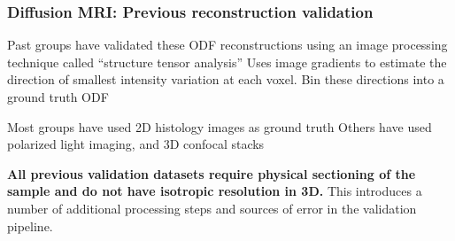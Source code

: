 \documentclass[presentation, 10pt]{beamer}
\begin{document}
\begin{frame}
  \frametitle{Diffusion MRI: Previous reconstruction validation}
  \begin{outline}
    \1 Past groups have validated these ODF reconstructions using an image processing technique
    called ``structure tensor analysis''
    \2 Uses image gradients to estimate the direction of smallest intensity variation at each voxel\cite{Bigun1987}.
    \2 Bin these directions into a ground truth ODF

    \1 Most groups have used 2D histology images as ground truth\cite{Budde2012, Budde2013, Mitter2015, Seehaus2015}
    \2 Others have used polarized light imaging\cite{Mollink2017, Axer2016}, and 3D confocal stacks\cite{Schilling2016, Schilling2018, Khan2015}

    \1 \textbf{All previous validation datasets require physical sectioning of
      the sample and do not have isotropic resolution in 3D.}
    \2 This introduces a number of additional processing steps and sources of error in
    the validation pipeline.
  \end{outline}
\end{frame}
\end{document}
